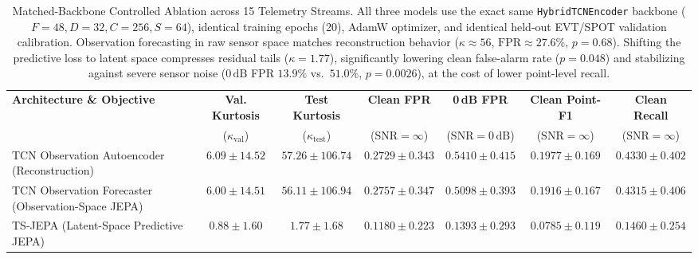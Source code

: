 \begin{table}[t]
\centering
\caption{Matched-Backbone Controlled Ablation across 15 Telemetry Streams. All three models use the exact same \texttt{HybridTCNEncoder} backbone ($F=48, D=32, C=256, S=64$), identical training epochs (20), AdamW optimizer, and identical held-out EVT/SPOT validation calibration. Observation forecasting in raw sensor space matches reconstruction behavior ($\kappa \approx 56$, $\text{FPR} \approx 27.6\%$, $p=0.68$). Shifting the predictive loss to latent space compresses residual tails ($\kappa = 1.77$), significantly lowering clean false-alarm rate ($p=0.048$) and stabilizing against severe sensor noise ($0\,\text{dB}$ FPR $13.9\%$ vs.\ $51.0\%$, $p=0.0026$), at the cost of lower point-level recall.}
\label{tab:controlled_backbone}
\small
\begin{tabular}{@{}lcccccc@{}} \toprule
\textbf{Architecture \& Objective} & \textbf{Val. Kurtosis} & \textbf{Test Kurtosis} & \textbf{Clean FPR} & \textbf{0\,dB FPR} & \textbf{Clean Point-F1} & \textbf{Clean Recall} \\
 & ($\kappa_{\text{val}}$) & ($\kappa_{\text{test}}$) & ($\text{SNR}=\infty$) & ($\text{SNR}=0\,\text{dB}$) & ($\text{SNR}=\infty$) & ($\text{SNR}=\infty$) \\ \midrule
TCN Observation Autoencoder (Reconstruction) & $6.09 \pm 14.52$ & $57.26 \pm 106.74$ & $0.2729 \pm 0.343$ & $0.5410 \pm 0.415$ & $0.1977 \pm 0.169$ & $0.4330 \pm 0.402$ \\
TCN Observation Forecaster (Observation-Space JEPA) & $6.00 \pm 14.51$ & $56.11 \pm 106.94$ & $0.2757 \pm 0.347$ & $0.5098 \pm 0.393$ & $0.1916 \pm 0.167$ & $0.4315 \pm 0.406$ \\
TS-JEPA (Latent-Space Predictive JEPA) & $0.88 \pm 1.60$ & $1.77 \pm 1.68$ & $0.1180 \pm 0.223$ & $0.1393 \pm 0.293$ & $0.0785 \pm 0.119$ & $0.1460 \pm 0.254$ \\
\bottomrule
\end{tabular}
\end{table}
